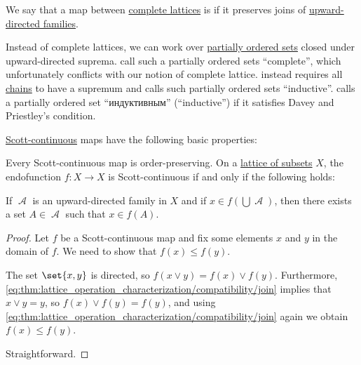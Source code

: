 \begin{definition}\label{def:scott_continuity}
  We say that a map between \hyperref[def:complete_lattice]{complete lattices} is  if it preserves joins of \hyperref[def:directed_set]{upward-directed families}.
\end{definition}
\begin{comments}
  \item Instead of complete lattices, we can work over \hyperref[def:partially_ordered_set]{partially ordered sets} closed under upward-directed suprema.  call such a partially ordered sets \enquote{complete}, which unfortunately conflicts with our notion of complete lattice.  instead requires all \hyperref[def:partial_order_chain/chain]{chains} to have a supremum and calls such partially ordered sets \enquote{inductive}.  calls a partially ordered set \enquote{индуктивным} (\enquote{inductive}) if it satisfies Davey and Priestley's condition.
\end{comments}

\begin{proposition}\label{thm:def:scott_continuity}
  \hyperref[def:scott_continuity]{Scott-continuous} maps have the following basic properties:
  \begin{thmenum}
     Every Scott-continuous map is order-preserving.
     On a \hyperref[thm:boolean_algebra_of_subsets]{lattice of subsets} \( X \), the endofunction \( f: X \to X \) is Scott-continuous if and only if the following holds:
    \begin{displayquote}
      If \( \mscrA \) is an upward-directed family in \( X \) and if \( x \in f(\bigcup \mscrA) \), then there exists a set \( A \in \mscrA \) such that \( x \in f(A) \).
    \end{displayquote}
  \end{thmenum}
\end{proposition}
\begin{proof}
   Let \( f \) be a Scott-continuous map and fix some elements \( x \) and \( y \) in the domain of \( f \). We need to show that \( f(x) \leq f(y) \).

  The set \( \set{ x, y } \) is directed, so \( f(x \vee y) = f(x) \vee f(y) \). Furthermore, \eqref{eq:thm:lattice_operation_characterization/compatibility/join} implies that \( x \vee y = y \), so \( f(x) \vee f(y) = f(y) \), and using \eqref{eq:thm:lattice_operation_characterization/compatibility/join} again we obtain \( f(x) \leq f(y) \).

   Straightforward.
\end{proof}

